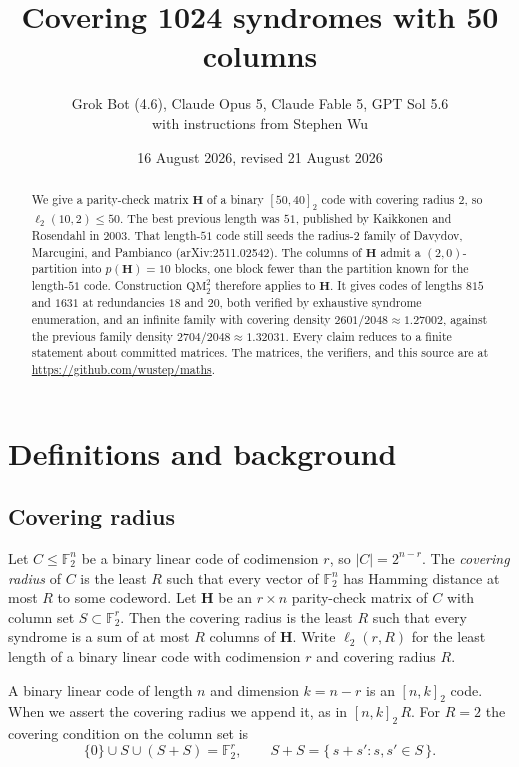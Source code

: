 \documentclass[11pt,a4paper]{article}
\title{Covering 1024 syndromes with 50 columns}
\author{\footnotesize Grok Bot (4.6), Claude Opus 5, Claude Fable 5, GPT Sol 5.6\\
{\tiny with instructions from Stephen Wu}}
\date{16 August 2026, revised 21 August 2026}
\newcommand{\FF}{\mathbb{F}}
\newcommand{\HH}{\boldsymbol{H}}
\newcommand{\ellr}{\ell_2}
\theoremstyle{remark}
\begin{document}
\maketitle

\begin{abstract}
We give a parity-check matrix $\HH$ of a binary $[50,40]_2$ code with
covering radius $2$, so $\ellr(10,2)\le 50$. The best previous length
was $51$, published by Kaikkonen and Rosendahl in 2003. That length-$51$
code still seeds the radius-$2$ family of Davydov, Marcugini, and
Pambianco (arXiv:2511.02542). The columns of $\HH$ admit a
$(2,0)$-partition into $p(\HH)=10$ blocks, one block fewer than the
partition known for the length-$51$ code. Construction
$\mathrm{QM}_2^2$ therefore applies to $\HH$. It gives codes of lengths
$815$ and $1631$ at redundancies $18$ and $20$, both verified by
exhaustive syndrome enumeration, and an infinite family with covering
density $2601/2048\approx 1.27002$, against the previous family density
$2704/2048\approx 1.32031$. Every claim reduces to a finite statement
about committed matrices. The matrices, the verifiers, and this source
are at \url{https://github.com/wustep/maths}.
\end{abstract}

\section{Definitions and background}

\subsection{Covering radius}

Let $C\le\FF_2^n$ be a binary linear code of codimension $r$, so
$\lvert C\rvert=2^{n-r}$. The \emph{covering radius} of $C$ is the least
$R$ such that every vector of $\FF_2^n$ has Hamming distance at most
$R$ to some codeword. Let $\HH$ be an $r\times n$ parity-check matrix
of $C$ with column set $S\subset\FF_2^r$. Then the covering radius is
the least $R$ such that every syndrome is a sum of at most $R$ columns
of $\HH$. Write $\ellr(r,R)$ for the least length of a binary linear
code with codimension $r$ and covering radius $R$.

A binary linear code of length $n$ and dimension $k=n-r$ is an
$[n,k]_2$ code. When we assert the covering radius we append it, as in
$[n,k]_2\,R$. For $R=2$ the covering condition on the column set is
\begin{equation}
\label{eq:cover}
\{0\}\cup S\cup(S+S)=\FF_2^r,
\qquad S+S=\{\,s+s' : s,s'\in S\,\}.
\end{equation}
\end{document}
